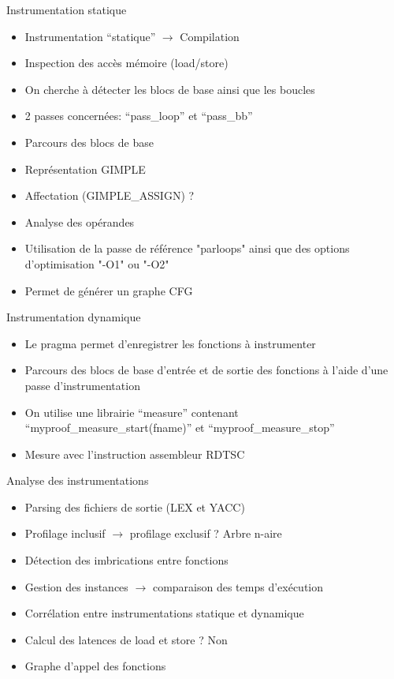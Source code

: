 \documentclass{beamer}
\begin{document}
\begin{frame}{Instrumentation statique}
  \begin{itemize}
  \item Instrumentation ``statique'' $\rightarrow$ Compilation
  \item Inspection des accès mémoire (load/store)
  \item On cherche à détecter les blocs de base ainsi que les boucles
  \item 2 passes concernées: ``pass\_loop'' et ``pass\_bb''
  \item Parcours des blocs de base
  \item Représentation GIMPLE
  \item Affectation (GIMPLE\_ASSIGN) ?
  \item Analyse des opérandes
  \item Utilisation de la passe de référence "parloops" ainsi que des options d'optimisation "-O1" ou "-O2"
  \item Permet de générer un graphe CFG
  \end{itemize}
\end{frame}

\begin{frame}{Instrumentation dynamique}
  \begin{itemize}
  \item Le pragma permet d'enregistrer les fonctions à instrumenter
  \item Parcours des blocs de base d'entrée et de sortie des fonctions à l'aide d'une passe d'instrumentation
  \item On utilise une librairie ``measure'' contenant ``myproof\_measure\_start(fname)'' et ``myproof\_measure\_stop''
  \item Mesure avec l'instruction assembleur RDTSC
  \end{itemize}
 \end{frame}

\begin{frame}{Analyse des instrumentations}
  \begin{itemize}
  \item Parsing des fichiers de sortie (LEX et YACC)
  \item Profilage inclusif $\rightarrow$ profilage exclusif ? Arbre n-aire
  \item Détection des imbrications entre fonctions
  \item Gestion des instances $\rightarrow$ comparaison des temps d'exécution
  \item Corrélation entre instrumentations statique et dynamique
  \item Calcul des latences de load et store ? Non
  \item Graphe d'appel des fonctions
  \end{itemize}
\end{frame}
\end{document}
